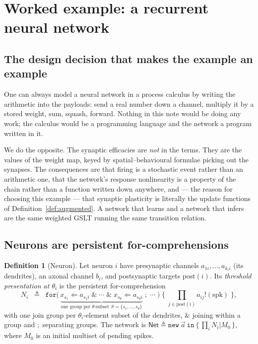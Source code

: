 \documentclass[11pt,a4paper]{article}
\theoremstyle{plain}
\theoremstyle{definition}
\newtheorem{definition}[theorem]{Definition}
\theoremstyle{remark}
\newcommand{\sepc}{\mathbin{\big|}}
\begin{document}
\section{Worked example: a recurrent neural network}
\label{sec:rnn}

\subsection{The design decision that makes the example an example}

One can always model a neural network in a process calculus by writing the arithmetic into the
payloads: send a real number down a channel, multiply it by a stored weight, sum, squash, forward.
Nothing in this note would be doing any work; the calculus would be a programming language and the
network a program written in it.

We do the opposite. The synaptic efficacies are \emph{not} in the terms. They are the values of the
weight map, keyed by spatial--behavioural formulae picking out the synapses. The consequences are
that firing is a stochastic event rather than an arithmetic one, that the network's response
nonlinearity is a property of the chain rather than a function written down anywhere, and --- the
reason for choosing this example --- that synaptic plasticity is literally the update functions of
Definition~\ref{def:augmented}. A network that learns and a network that infers are the same weighted
GSLT running the same transition relation.

\subsection{Neurons are persistent for-comprehensions}

\begin{definition}[Neuron]
\label{def:neuron}
Let neuron $i$ have presynaptic channels $a_{1i}, \ldots, a_{k_i i}$ (its dendrites), an axonal
channel $b_i$, and postsynaptic targets $\mathrm{post}(i)$. Its \emph{threshold presentation at
$\theta_i$} is the persistent for-comprehension
\[
N_i \;\;\triangleq\;\;
\texttt{for}\big(\,
\underbrace{x_{s_1} \Leftarrow a_{s_1 i} \;\&\; \cdots \;\&\; x_{s_{\theta}} \Leftarrow a_{s_\theta i}}_{\text{one group per }\theta\text{-subset } S = \{s_1,\ldots,s_\theta\}}
\;;\; \cdots \;\big)\;\big\{\;\textstyle\prod_{j \in \mathrm{post}(i)} a_{ij}!(\mathrm{spk})\;\big\},
\]
with one join group per $\theta_i$-element subset of the dendrites, $\&$ joining within a group and
$;$ separating groups. The network is
$\mathsf{Net} \triangleq \texttt{new}\ \vec{a}\ \texttt{in}\ \{\, \prod_i N_i \sepc M_0 \,\}$, where
$M_0$ is an initial multiset of pending spikes.
\end{definition}
\end{document}
